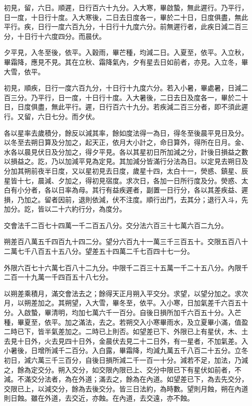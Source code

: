 \begin{pinyinscope}
 初見，留，六日。順遲，日行百六十九分。入大寒，畢啟蟄，無此遲行。乃平行，日一度，十日行十度。入大寒後，二日去日度各一，畢於二十日，日度俱盡，無此平行。疾，日行一度六百九分，十日行十九度六分。前無遲行者，此疾日減二百三分，十日行十六度四分。而晨伏。



 夕平見，入冬至後，依平。入穀雨，畢芒種，均減二日。入夏至，依平。入立秋，畢霜降，應見不見。其在立秋、霜降氣內，夕有星去日如前者，亦見。入立冬，畢大雪，依平。



 初見，順疾，日行一度六百九分，十日行十九度六分。若入小暑，畢處暑，日減二百三分。乃平行，日一度，十日行十度。入大暑後，二日去日及度各一，畢於二十日，日度俱盡，無此平行。遲，日行百六十九分。若疾減二百三分者，即不須此遲行。又留，六日七分。而夕伏。



 各以星率去歲積分，餘反以減其率，餘如度法得一為日，得冬至後晨平見日及分。以冬至去朔日算及分加之，起天正，依月大小計之，命日算外，得所在日月。金、水各以晨見伏日及分加之，得夕平見。各以其星初日所加減之分，計後日損益之數以損益之。訖，乃以加減平見為定見。其加減分皆滿行分法為日。以定見去朔日及分加其朔前夜半日度，又以星初見去日度，歲星十四，太白十一，熒惑、鎮星、辰星皆十七，晨減、夕加之，得初見宿度。求次日，各加一日所行度及分。熒惑、太白有小分者，各以日率為母。其行有益疾遲者，副置一日行分，各以其差疾益、遲損，乃加之。留者因前，退則依減，伏不注度。順行出鬥，去其分；退行入斗，先加分。訖，皆以二十六約行分，為度分。



 交會法千二百七十四萬一千二百五八分。交分法六百三十七萬六百二九分。



 朔差百八萬五千四百九十四二分。望分六百九十一萬三千三百五十。交限五百八十二萬七千八百五十五八分。望差五十四萬二千七百四十七一分。



 外限六百七十六萬七百八十二九分。中限千二百三十五萬一千二十五八分。內限千二百一十九萬一千四百五十八七分。



 以朔差乘積月，滿交會法去之；餘得天正月朔入平交分。求望，以望分加之。求次月，以朔差加之。其朔望，入大雪，畢冬至，依平。入小寒，日加氣差千六百五十分。入啟蟄，畢清明，均加七萬六千一百分。自後日損所加千六百五十分。入芒種，畢夏至，依平。加之滿法，去之。若朔交入小寒畢雨水，及立夏畢小滿，值盈二時已下，皆半氣差加之。二時已上則否。如望差已下、外限已上有星伏，木、土去見十日外，火去見四十日外，金晨伏去見二十二日外，有一星者，不加氣差。入小暑後，日增所減千二百分。入白露，畢霜降，均減九萬五千八百二十五分。立冬初日，減六萬三千三百分，自後日損所減二千一百一十分。減若不足，加法，乃減之，餘為定交分。朔入交分，如交限內限已上、交分中限已下有星伏如前者，不減。不滿交分法者，為在外道；滿去之，餘為在內道。如望差已下，為去先交分，交限已上，以減交分，餘為去後交分。皆三日法約，為時數。望則月蝕，朔在內道則日蝕。雖在外道，去交近，亦蝕。在內道，去交遠，亦不蝕。




\end{pinyinscope}
